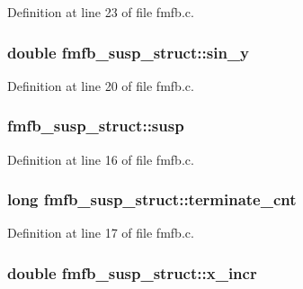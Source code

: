 Definition at line 23 of file fmfb.\+c.

\subsubsection[{\texorpdfstring{sin\+\_\+y}{sin_y}}]{\setlength{\rightskip}{0pt plus 5cm}double fmfb\+\_\+susp\+\_\+struct\+::sin\+\_\+y}\hypertarget{structfmfb__susp__struct_a49ab86b714007a45a7dedbea33121703}{}\label{structfmfb__susp__struct_a49ab86b714007a45a7dedbea33121703}


Definition at line 20 of file fmfb.\+c.

\subsubsection[{\texorpdfstring{susp}{susp}}]{ fmfb\+\_\+susp\+\_\+struct\+::susp}\hypertarget{structfmfb__susp__struct_ae08e1b5d638165432cadfe62852ce0c0}{}\label{structfmfb__susp__struct_ae08e1b5d638165432cadfe62852ce0c0}


Definition at line 16 of file fmfb.\+c.

\subsubsection[{\texorpdfstring{terminate\+\_\+cnt}{terminate_cnt}}]{\setlength{\rightskip}{0pt plus 5cm}long fmfb\+\_\+susp\+\_\+struct\+::terminate\+\_\+cnt}\hypertarget{structfmfb__susp__struct_af4aeb64dd40322fb7e54190c19c44565}{}\label{structfmfb__susp__struct_af4aeb64dd40322fb7e54190c19c44565}


Definition at line 17 of file fmfb.\+c.

\subsubsection[{\texorpdfstring{x\+\_\+incr}{x_incr}}]{\setlength{\rightskip}{0pt plus 5cm}double fmfb\+\_\+susp\+\_\+struct\+::x\+\_\+incr}\hypertarget{structfmfb__susp__struct_ab8f9c6f9cef850571823ba6bdedf0272}{}\label{structfmfb__susp__struct_ab8f9c6f9cef850571823ba6bdedf0272}


